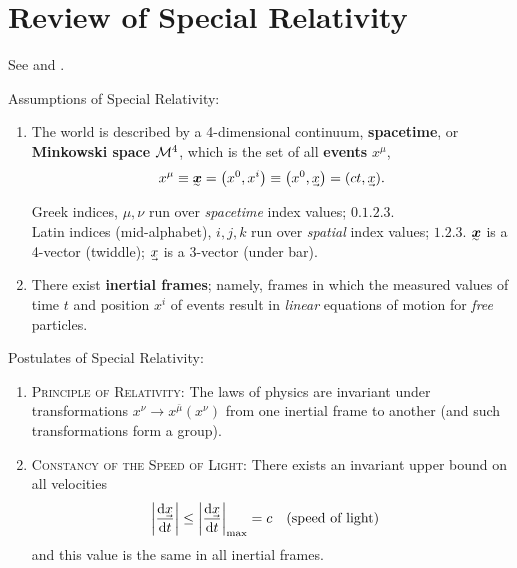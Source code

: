\chapter[Review of Special Relativity]{Review of Special Relativity}

\begin{note}[Background]
See \cite[ch~1]{schutz2009first} and \cite[ch 5, 12, 13]{doughty2018lagrangian}.
\end{note}

\noindent
Assumptions of Special Relativity:
\begin{enumerate}
    \item The world is described by a 4-dimensional continuum, \textbf{spacetime}, or \textbf{Minkowski space} $\mathcal M^4$, which is the set of all \textbf{events} $x^\mu$,
    \begin{align}
        x^\mu \equiv \ts x = \qty(x^0, x^i) \equiv \qty(x^0, \uvec x) = \qty(ct, \uvec x)
    .\end{align}
    \begin{note}[Notation]
    Greek indices, $\mu,\nu$ run over \textit{spacetime} index values; $\qty{0,1,2,3}$. \\
    Latin indices (mid-alphabet), $i,j,k$ run over \textit{spatial} index values; $\qty{1,2,3}$.
    $\ts x$ is a 4-vector (twiddle); $\uvec x$ is a 3-vector (under bar).
    \end{note}
    
    \item There exist \textbf{inertial frames}; namely, frames in which the measured values of time $t$ and position $x^i$ of events result in \textit{linear} equations of motion for \textit{free} particles.
\end{enumerate}


\noindent
Postulates of Special Relativity:
\begin{enumerate}
    \item \textsc{Principle of Relativity:}
    The laws of physics are invariant under transformations $x^\nu \to x^{\bar\mu}(x^\nu)$ from one inertial frame to another (and such transformations form a group).
    \label{first-postulate-of-SR}
    
    \item \textsc{Constancy of the Speed of Light:} There exists an invariant upper bound on all velocities
    \begin{align}
        \qty|\dv{\uvec x}{t}| \le \qty|\dv{\uvec x}{t}|_\text{max} = c
        \qqtext{(speed of light)}
    \end{align}
    and this value is the same in all inertial frames.
\end{enumerate}
    
